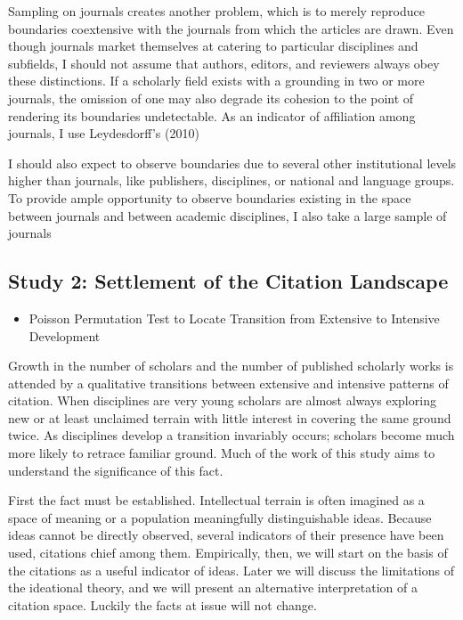 Sampling on journals creates another problem, which is to merely
reproduce boundaries coextensive with the journals from which the
articles are drawn. Even though journals market themselves at catering
to particular disciplines and subfields, I should not assume that
authors, editors, and reviewers always obey these distinctions. If a
scholarly field exists with a grounding in two or more journals, the
omission of one may also degrade its cohesion to the point of rendering
its boundaries undetectable. As an indicator of affiliation among
journals, I use Leydesdorff's (2010)

I should also expect to observe boundaries due to several other
institutional levels higher than journals, like publishers, disciplines,
or national and language groups. To provide ample opportunity to observe
boundaries existing in the space between journals and between academic
disciplines, I also take a large sample of journals

\subsection{Study 2: Settlement of the Citation
Landscape}\label{study-2-settlement-of-the-citation-landscape}

\begin{itemize}
\tightlist
\item
  Poisson Permutation Test to Locate Transition from Extensive to
  Intensive Development
\end{itemize}

Growth in the number of scholars and the number of published scholarly
works is attended by a qualitative transitions between extensive and
intensive patterns of citation. When disciplines are very young scholars
are almost always exploring new or at least unclaimed terrain with
little interest in covering the same ground twice. As disciplines
develop a transition invariably occurs; scholars become much more likely
to retrace familiar ground. Much of the work of this study aims to
understand the significance of this fact.

First the fact must be established. Intellectual terrain is often
imagined as a space of meaning or a population meaningfully
distinguishable ideas. Because ideas cannot be directly observed,
several indicators of their presence have been used, citations chief
among them. Empirically, then, we will start on the basis of the
citations as a useful indicator of ideas. Later we will discuss the
limitations of the ideational theory, and we will present an alternative
interpretation of a citation space. Luckily the facts at issue will not
change.

